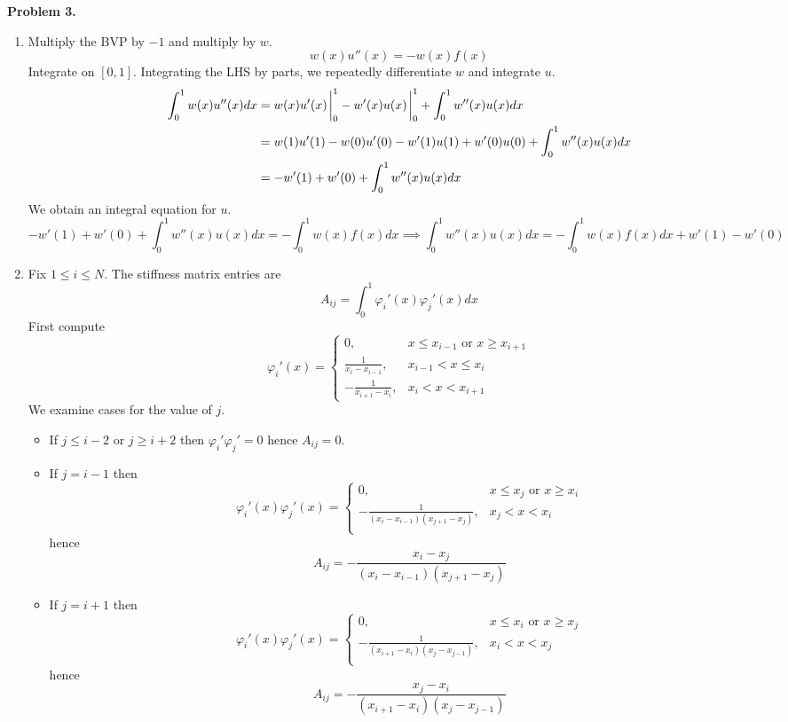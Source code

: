 \documentclass{article}
\def\tbf#1{\textbf{#1}}
\newcommand{\vp}{\varphi}
\newcommand{\imp}{\implies}
\begin{document}
\tbf{Problem 3.}

\begin{enumerate}[label=(\alph*)]
	
\item Multiply the BVP by $-1$ and multiply by $w$.
$$w(x)u''(x) = -w(x)f(x)$$
Integrate on $[0,1]$. Integrating the LHS by parts, we repeatedly differentiate $w$ and integrate $u$.
\begin{align*}
	\int_0^1 w(x)u''(x)dx &= w(x)u'(x)\eval_0^1 - w'(x)u(x)\eval_0^1 + \int_0^1 w''(x)u(x)dx\\
	&= w(1)u'(1) - w(0)u'(0) - w'(1)u(1) + w'(0)u(0) + \int_0^1 w''(x)u(x)dx\\
	&= -w'(1) + w'(0) + \int_0^1 w''(x)u(x)dx
\end{align*}
We obtain an integral equation for $u$.
$$-w'(1) + w'(0) + \int_0^1 w''(x)u(x)dx = -\int_0^1 w(x)f(x)dx
\imp \int_0^1 w''(x)u(x)dx = -\int_0^1 w(x)f(x)dx + w'(1) - w'(0)$$


\item Fix $1\le i\le N$. The stiffness matrix entries are
$$A_{ij} = \int_0^1\vp_i'(x)\vp_j'(x)dx$$
First compute
$$\vp_i'(x) =
\begin{cases}
	0, & x\le x_{i-1} \text{ or } x\ge x_{i+1}\\
	\frac{1}{x_i-x_{i-1}}, & x_{i-1}<x\le x_i\\
	-\frac{1}{x_{i+1}-x_i}, & x_i<x<x_{i+1}
\end{cases}$$
We examine cases for the value of $j$.

\begin{itemize}
	
	\item If $j\le i-2$ or $j\ge i+2$ then $\vp_i'\vp_j'=0$ hence $A_{ij}=0$.
	
	\item If $j=i-1$ then
	$$\vp_i'(x)\vp_j'(x) =
	\begin{cases}
		0, & x\le x_j \text{ or } x\ge x_i\\
		-\frac{1}{(x_i-x_{i-1})(x_{j+1}-x_j)}, & x_j<x<x_i\\
	\end{cases}$$
	hence
	$$A_{ij} = -\frac{x_i-x_j}{(x_i-x_{i-1})(x_{j+1}-x_j)}$$
	
	\item If $j=i+1$ then
	$$\vp_i'(x)\vp_j'(x) =
	\begin{cases}
		0, & x\le x_i \text{ or } x\ge x_j\\
		-\frac{1}{(x_{i+1}-x_{i})(x_{j}-x_{j-1})}, & x_i<x<x_j\\
	\end{cases}$$
	hence
	$$A_{ij} = -\frac{x_j-x_i}{(x_{i+1}-x_{i})(x_{j}-x_{j-1})}$$
	

\end{itemize}
\end{enumerate}
\end{document}
